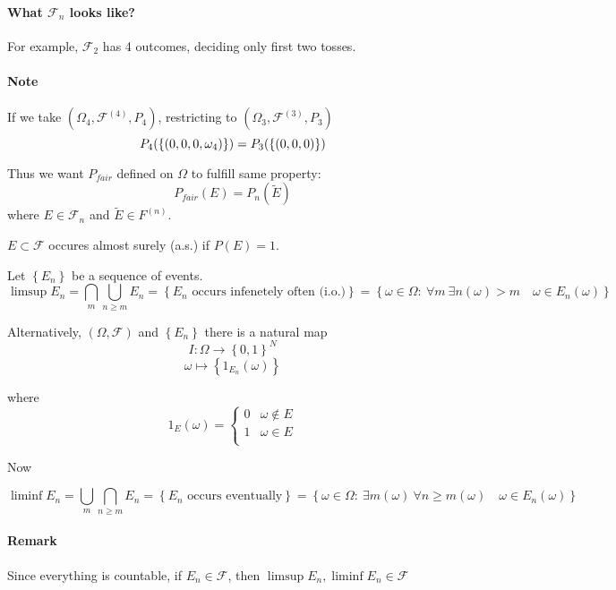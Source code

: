 \paragraph{What $\mathcal{F}_n$ looks like?}
For example, $\mathcal{F}_2$ has 4 outcomes, deciding only first two tosses.
\paragraph{Note} If we take $(\Omega_4, \mathcal{F}^{(4)}, P_4)$, restricting to $(\Omega_3, \mathcal{F}^{(3)}, P_3)$
$$P_4\qty(\left\{ (0,0,0,\omega_4)\right\}) = P_3\qty(\left\{ (0,0,0)\right\})  $$


Thus we want $P_{fair}$ defined on $\Omega$ to  fulfill same property:
$$P_{fair}(E) = P_n(\tilde{E})$$
where $E \in \mathcal{F}_n$ and $\tilde{E} \in F^{(n)}$.

\begin{definition}
	$E\subset \mathcal{F}$ occures almost surely (a.s.) if $P(E)=1$.
\end{definition}


\begin{definition}
 Let	$\left\{ E_n \right\}$ be a sequence of events.
 $$\limsup E_n = \bigcap_{m}\bigcup_{n\geq m} E_n = \left\{ E_n \text{ occurs infenetely often (i.o.)} \right\} = \left\{ \omega \in \Omega  : \: \forall m \: \exists n(\omega)>m \quad \omega \in E_n(\omega) \right\}$$
 
 Alternatively, $(\Omega, \mathcal{F})$ and $\left\{ E_n \right\}$  there is a natural map 
 $$I: \Omega \to \left\{ 0,1\right\}^N$$
 $$\omega \mapsto \left\{ 1_{E_n} (\omega) \right\}$$
 
 where $$1_{E}(\omega) = \begin{cases}
 0 & \omega \notin E\\
 1 & \omega \in E\\
 \end{cases}$$
 
 Now
 
 $$\liminf E_n = \bigcup_{m}\bigcap_{n\geq m} E_n = \left\{ E_n \text{ occurs eventually} \right\} = \left\{ \omega \in \Omega  : \: \exists m(\omega) \: \forall n\geq m(\omega) \quad \omega \in E_n(\omega) \right\}$$
\end{definition}

\paragraph{Remark}
Since everything is countable, if $E_n \in \mathcal{F}$, then $\limsup E_n,\liminf E_n\in \mathcal{F}$ 

